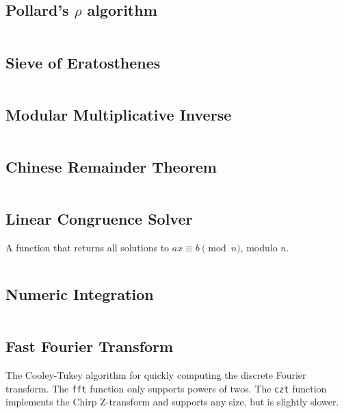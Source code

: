 \documentclass[9pt,a4paper,twocolumn,landscape,oneside]{amsart}
\newcommand{\code}[1]{\inputminted{cpp}{_code/#1}}
\newif\ifverbose
\begin{document}
    \subsection{Pollard's $\rho$ algorithm}
        \code{mathematics/pollard_rho.cpp}

    \subsection{Sieve of Eratosthenes}
        \ifverbose
        An optimized implementation of Eratosthenes' Sieve.
        \fi
        \code{mathematics/prime_sieve.cpp}

    \subsection{Modular Multiplicative Inverse}
        \ifverbose
        A function to find a modular multiplicative inverse.
        \fi
        \code{mathematics/mod_inv.cpp}

    \ifverbose
    \subsection{Modular Exponentiation}
        A function to perform fast modular exponentiation.
        \code{mathematics/mod_pow.cpp}
    \fi

    \subsection{Chinese Remainder Theorem}
        \ifverbose
        An implementation of the Chinese Remainder Theorem.
        \fi
        \code{mathematics/crt.cpp}

    \subsection{Linear Congruence Solver}
        A function that returns all solutions to $ax \equiv b \pmod{n}$, modulo $n$.
        \code{mathematics/linear_congruence.cpp}

    \subsection{Numeric Integration}
        \ifverbose
        Numeric integration using Simpson's rule.
        \fi
        \code{mathematics/numeric_integration.cpp}

    \subsection{Fast Fourier Transform}
        The Cooley-Tukey algorithm for quickly computing the discrete Fourier
        transform. The \texttt{fft} function only supports powers of twos. The
        \texttt{czt} function implements the Chirp Z-transform and supports any
        size, but is slightly slower.
        \code{mathematics/fft.cpp}
\end{document}
